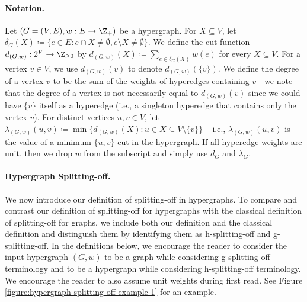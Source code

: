 \documentclass{article}
\newcommand{\knote}[1]{{\color{red}[{\tiny Karthik: \bf #1}]\marginpar{\color{red}*}}}
\begin{document}
\paragraph{Notation.} Let $(G=(V, E), w: E\rightarrow \Z_+)$ be a hypergraph. 
For $X\subseteq V$, let $\delta_G(X)\coloneqq \{e\in E: e\cap X\neq \emptyset, e\setminus X\neq \emptyset\}$.  
We define the cut function $d_{(G, w)}: 2^V\rightarrow \Z_{\ge 0}$ by $d_{(G, w)}(X) \coloneqq \sum_{e\in \delta_G(X)}w(e)$ for every $X\subseteq V$. 
For a vertex $v\in V$, we use $d_{(G,w)}(v)$ to denote $d_{(G,w)}(\{v\})$. 
We define the degree of a vertex $v$ to be the sum of the weights of hyperedges containing $v$---we note that the degree of a vertex is not necessarily equal to $d_{(G, w)}(v)$ since we could have $\{v\}$ itself as a hyperedge (i.e., a singleton hyperedge that contains only the vertex $v$). 
For distinct vertices $u, v\in V$, let $\lambda_{(G, w)}(u, v)\coloneqq \min\{d_{(G, w)}(X): u\in X\subseteq V\setminus \{v\}\}$ -- i.e., $\lambda_{(G, w)}(u, v)$ is the value of a minimum $\{u, v\}$-cut in the hypergraph. If all hyperedge weights are unit, then we drop $w$ from the subscript and simply use $d_G$ and $\lambda_G$. 

\paragraph{Hypergraph Splitting-off.} 
We now introduce our definition of splitting-off in hypergraphs. 
To compare and contrast our definition of splitting-off for hypergraphs with the classical definition of splitting-off for graphs, we include both our definition and the classical definition and distinguish them by identifying them as h-splitting-off and g-splitting-off. 
In the definitions below, we encourage the reader to consider the input hypergraph $(G, w)$ to be a graph while considering g-splitting-off terminology and to be a hypergraph while considering h-splitting-off terminology. We encourage the reader to also assume unit weights during first read. See Figure \ref{figure:hypergraph-splitting-off-example-1} for an example. 
\end{document}
